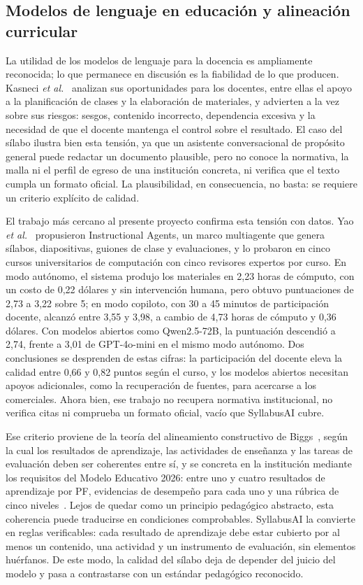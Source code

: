 \subsection{Modelos de lenguaje en educación y alineación curricular}
La utilidad de los modelos de lenguaje para la docencia es ampliamente reconocida; lo que permanece en discusión es la fiabilidad de lo que producen. Kasneci \textit{et al.}~\cite{kasneci2023chatgpt} analizan sus oportunidades para los docentes, entre ellas el apoyo a la planificación de clases y la elaboración de materiales, y advierten a la vez sobre sus riesgos: sesgos, contenido incorrecto, dependencia excesiva y la necesidad de que el docente mantenga el control sobre el resultado. El caso del sílabo ilustra bien esta tensión, ya que un asistente conversacional de propósito general puede redactar un documento plausible, pero no conoce la normativa, la malla ni el perfil de egreso de una institución concreta, ni verifica que el texto cumpla un formato oficial. La plausibilidad, en consecuencia, no basta: se requiere un criterio explícito de calidad.

El trabajo más cercano al presente proyecto confirma esta tensión con datos. Yao \textit{et al.}~\cite{yao2025instructional} propusieron Instructional Agents, un marco multiagente que genera sílabos, diapositivas, guiones de clase y evaluaciones, y lo probaron en cinco cursos universitarios de computación con cinco revisores expertos por curso. En modo autónomo, el sistema produjo los materiales en 2,23 horas de cómputo, con un costo de 0,22 dólares y sin intervención humana, pero obtuvo puntuaciones de 2,73 a 3,22 sobre 5; en modo copiloto, con 30 a 45 minutos de participación docente, alcanzó entre 3,55 y 3,98, a cambio de 4,73 horas de cómputo y 0,36 dólares. Con modelos abiertos como Qwen2.5-72B, la puntuación descendió a 2,74, frente a 3,01 de GPT-4o-mini en el mismo modo autónomo. Dos conclusiones se desprenden de estas cifras: la participación del docente eleva la calidad entre 0,66 y 0,82 puntos según el curso, y los modelos abiertos necesitan apoyos adicionales, como la recuperación de fuentes, para acercarse a los comerciales. Ahora bien, ese trabajo no recupera normativa institucional, no verifica citas ni comprueba un formato oficial, vacío que SyllabusAI cubre.


Ese criterio proviene de la teoría del alineamiento constructivo de Biggs~\cite{biggs1996alignment}, según la cual los resultados de aprendizaje, las actividades de enseñanza y las tareas de evaluación deben ser coherentes entre sí, y se concreta en la institución mediante los requisitos del Modelo Educativo 2026: entre uno y cuatro resultados de aprendizaje por PF, evidencias de desempeño para cada uno y una rúbrica de cinco niveles~\cite{uti2026modelo}. Lejos de quedar como un principio pedagógico abstracto, esta coherencia puede traducirse en condiciones comprobables. SyllabusAI la convierte en reglas verificables: cada resultado de aprendizaje debe estar cubierto por al menos un contenido, una actividad y un instrumento de evaluación, sin elementos huérfanos. De este modo, la calidad del sílabo deja de depender del juicio del modelo y pasa a contrastarse con un estándar pedagógico reconocido.

